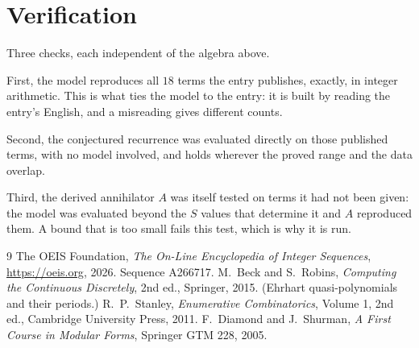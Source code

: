 \documentclass[11pt,a4paper]{article}
\theoremstyle{plain}
\theoremstyle{definition}
\begin{document}
\section{Verification}

Three checks, each independent of the algebra above.

First, the model reproduces all $18$ terms the entry publishes, exactly, in integer
arithmetic. This is what ties the model to the entry: it is built by reading the entry's
English, and a misreading gives different counts.

Second, the conjectured recurrence was evaluated directly on those published terms, with no
model involved, and holds wherever the proved range and the data overlap.

Third, the derived annihilator $A$ was itself tested on terms it had not been given: the model
was evaluated beyond the $S$ values that determine it and $A$ reproduced them. A bound that is
too small fails this test, which is why it is run.

\begin{thebibliography}{9}
 The OEIS Foundation, \emph{The On-Line Encyclopedia of Integer
Sequences}, \url{https://oeis.org}, 2026. Sequence A266717.
 M.~Beck and S.~Robins, \emph{Computing the Continuous Discretely},
2nd ed., Springer, 2015. (Ehrhart quasi-polynomials and their periods.)
 R.~P.~Stanley, \emph{Enumerative Combinatorics}, Volume 1, 2nd ed.,
Cambridge University Press, 2011.
 F.~Diamond and J.~Shurman, \emph{A First Course in Modular Forms},
Springer GTM 228, 2005.
\end{thebibliography}
\end{document}
